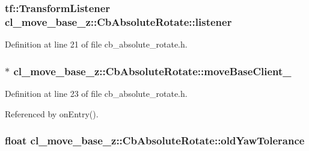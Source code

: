 \subsubsection[{\texorpdfstring{listener}{listener}}]{\setlength{\rightskip}{0pt plus 5cm}tf\+::\+Transform\+Listener cl\+\_\+move\+\_\+base\+\_\+z\+::\+Cb\+Absolute\+Rotate\+::listener}\hypertarget{classcl__move__base__z_1_1CbAbsoluteRotate_ad946bb6486dc35baf03ec1cc430a3406}{}\label{classcl__move__base__z_1_1CbAbsoluteRotate_ad946bb6486dc35baf03ec1cc430a3406}


Definition at line 21 of file cb\+\_\+absolute\+\_\+rotate.\+h.

\subsubsection[{\texorpdfstring{move\+Base\+Client\+\_\+}{moveBaseClient_}}]{$\ast$ cl\+\_\+move\+\_\+base\+\_\+z\+::\+Cb\+Absolute\+Rotate\+::move\+Base\+Client\+\_\+}\hypertarget{classcl__move__base__z_1_1CbAbsoluteRotate_a8ddbef73316ff96f30493b28b5627e35}{}\label{classcl__move__base__z_1_1CbAbsoluteRotate_a8ddbef73316ff96f30493b28b5627e35}


Definition at line 23 of file cb\+\_\+absolute\+\_\+rotate.\+h.



Referenced by on\+Entry().

\subsubsection[{\texorpdfstring{old\+Yaw\+Tolerance}{oldYawTolerance}}]{\setlength{\rightskip}{0pt plus 5cm}float cl\+\_\+move\+\_\+base\+\_\+z\+::\+Cb\+Absolute\+Rotate\+::old\+Yaw\+Tolerance\hspace{0.3cm}{\ttfamily [private]}}\hypertarget{classcl__move__base__z_1_1CbAbsoluteRotate_a2cfcd2978e7923494e2e66107e134e27}{}\label{classcl__move__base__z_1_1CbAbsoluteRotate_a2cfcd2978e7923494e2e66107e134e27}



